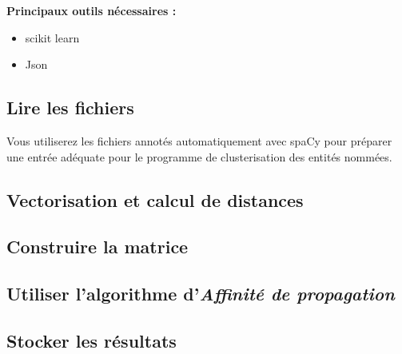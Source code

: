 \textbf{Principaux outils nécessaires :}
\begin{itemize}
  \item scikit learn
  \item Json
  
\end{itemize}



\vspace{0.5cm}
\subsection*{Lire les fichiers}
\vspace{0.5cm}
Vous utiliserez les fichiers annotés automatiquement avec spaCy pour préparer une entrée adéquate pour le programme de clusterisation des entités nommées.
\vspace{0.5cm}

\subsection*{Vectorisation et calcul de distances}
 \begin{python}   

 \end{python}

\subsection*{Construire la matrice}
 \begin{python}   

 \end{python}

\subsection*{Utiliser l'algorithme d'\textit{Affinité de propagation}}
 \begin{python}   

 \end{python}



\subsection*{Stocker les résultats}
 \begin{python}   

 \end{python}
 
